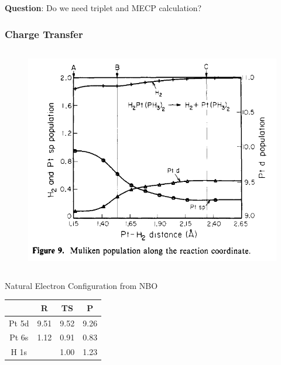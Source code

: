 \documentclass[10pt,aspectratio=43,mathserif]{beamer}
\begin{document}
\begin{frame}
\textbf{Question}: Do we need triplet and MECP calculation?

\end{frame}

\begin{frame}
\frametitle{Charge Transfer}
\begin{columns}
	\begin{figure}
		\includegraphics[width=\linewidth]{pop.jpg}
	\end{figure}
\end{columns}

Natural Electron Configuration from NBO
\begin{table}
	\centering
	\begin{tabular}{c|ccc}
		\hline
		& R & TS & P \\ \hline
		Pt 5d & 9.51  &9.52& 9.26\\
		Pt 6s & 1.12 &0.91& 0.83\\
		H 1s &   & 1.00& 1.23\\
		\hline
	\end{tabular}
\end{table}



\end{frame}
\end{document}
